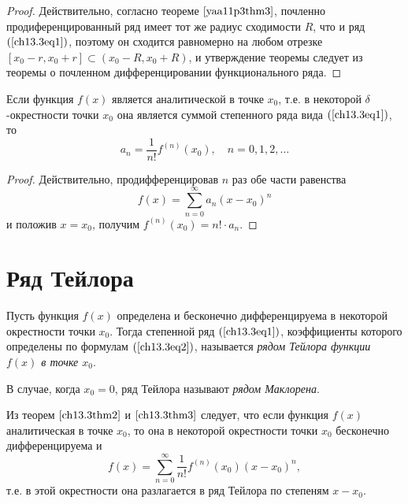 \begin{proof}
Действительно, согласно теореме $\ref{yaa11p3thm3}$, почленно продиференцированный ряд имеет тот же радиус сходимости $R$, что и ряд $(\ref{ch13.3eq1})$, поэтому он сходится равномерно на любом отрезке $[x_0 - r, x_0 + r] \subset (x_0 - R, x_0 + R)$, и утверждение теоремы следует из теоремы о почленном дифференцировании функционального ряда.
\end{proof}

\begin{thm} \label{ch13.3thm3}
Если функция $f(x)$ является аналитической в точке $x_0$, т.е. в некоторой $\delta$-окрестности точки $x_0$ она является суммой степенного ряда вида $(\ref{ch13.3eq1})$, то
\begin{equation} \label{ch13.3eq2}
a_n = \frac{1}{n!} f^{(n)}(x_0), \quad n = 0, 1, 2, \ldots
\end{equation}
\end{thm}
\begin{proof}
Действительно, продифференцировав $n$ раз обе части равенства
$$
f(x) = \sum\limits_{n = 0}^{\infty} a_n(x - x_0)^n
$$
и положив $x = x_0$, получим $f^{(n)}(x_0) = n!\cdot a_n$.
\end{proof}
\section{Ряд Тейлора}

\begin{defn}
Пусть функция $f(x)$ определена и бесконечно дифференцируема в некоторой окрестности точки $x_0$. Тогда степенной ряд $(\ref{ch13.3eq1})$, коэффициенты которого определены по формулам $(\ref{ch13.3eq2})$, называется \textit{рядом Тейлора функции $f(x)$ в точке $x_0$}.

В случае, когда $x_0 = 0$, ряд Тейлора называют \textit{рядом Маклорена}.

Из теорем $\ref{ch13.3thm2}$ и $\ref{ch13.3thm3}$ следует, что если функция $f(x)$ аналитическая в точке $x_0$, то она в некоторой окрестности точки $x_0$ бесконечно дифференцируема и
$$
f(x) = \sum\limits_{n = 0}^{\infty} \frac{1}{n!}f^{(n)}(x_0)(x - x_0)^n,
$$
т.е. в этой окрестности она разлагается в ряд Тейлора по степеням $x - x_0$.
\end{defn}

